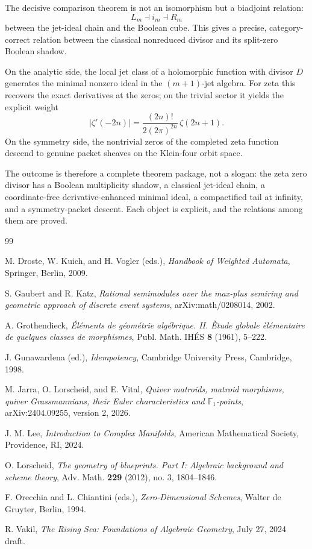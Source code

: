 \documentclass[11pt,a4paper]{article}
\theoremstyle{definition}
\theoremstyle{remark}
\begin{document}
The decisive comparison theorem is not an isomorphism but a biadjoint relation:
\[
L_m\dashv i_m\dashv R_m
\]
between the jet-ideal chain and the Boolean cube.  This gives a precise, category-correct relation between the classical nonreduced divisor and its split-zero Boolean shadow.

On the analytic side, the local jet class of a holomorphic function with divisor $D$ generates the minimal nonzero ideal in the $(m+1)$-jet algebra.  For zeta this recovers the exact derivatives at the zeros; on the trivial sector it yields the explicit weight
\[
|\zeta'(-2n)|=\frac{(2n)!}{2(2\pi)^{2n}}\,\zeta(2n+1).
\]
On the symmetry side, the nontrivial zeros of the completed zeta function descend to genuine packet sheaves on the Klein-four orbit space.

The outcome is therefore a complete theorem package, not a slogan: the zeta zero divisor has a Boolean multiplicity shadow, a classical jet-ideal chain, a coordinate-free derivative-enhanced minimal ideal, a compactified tail at infinity, and a symmetry-packet descent.  Each object is explicit, and the relations among them are proved.

\begin{thebibliography}{99}

M. Droste, W. Kuich, and H. Vogler (eds.),
\emph{Handbook of Weighted Automata},
Springer, Berlin, 2009.

S. Gaubert and R. Katz,
\emph{Rational semimodules over the max-plus semiring and geometric approach of discrete event systems},
arXiv:math/0208014, 2002.

A. Grothendieck,
\emph{\'El\'ements de g\'eom\'etrie alg\'ebrique. II. \`Etude globale \`el\'ementaire de quelques classes de morphismes},
Publ. Math. IH\'ES \textbf{8} (1961), 5--222.

J. Gunawardena (ed.),
\emph{Idempotency},
Cambridge University Press, Cambridge, 1998.

M. Jarra, O. Lorscheid, and E. Vital,
\emph{Quiver matroids, matroid morphisms, quiver Grassmannians, their Euler characteristics and $\mathbb F_1$-points},
arXiv:2404.09255, version 2, 2026.

J. M. Lee,
\emph{Introduction to Complex Manifolds},
American Mathematical Society, Providence, RI, 2024.

O. Lorscheid,
\emph{The geometry of blueprints. Part I: Algebraic background and scheme theory},
Adv. Math. \textbf{229} (2012), no. 3, 1804--1846.

F. Orecchia and L. Chiantini (eds.),
\emph{Zero-Dimensional Schemes},
Walter de Gruyter, Berlin, 1994.

R. Vakil,
\emph{The Rising Sea: Foundations of Algebraic Geometry},
July 27, 2024 draft.

\end{thebibliography}
\end{document}
